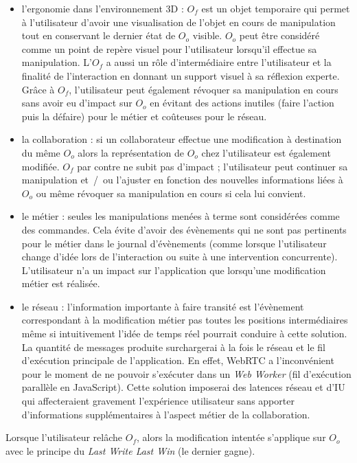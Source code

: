 \begin{itemize}
	\item l'ergonomie dans l'environnement 3D :
	$O_f$ est un objet temporaire qui permet à l'utilisateur
	d'avoir une visualisation de l'objet en cours de manipulation tout en 
	conservant le dernier état de $O_o$ visible. 
	$O_o$ peut être considéré comme un point de repère visuel pour l'utilisateur 
	lorsqu'il effectue sa manipulation. 
	L'$O_f$ a aussi un rôle d'intermédiaire entre l'utilisateur et la 
	finalité de l'interaction en donnant un support visuel à sa réflexion experte.
	Grâce à $O_f$, l'utilisateur peut également révoquer sa manipulation en 
	cours sans avoir eu d'impact sur $O_o$ en évitant des actions inutiles (faire l'action 
	puis la défaire) pour le métier et coûteuses pour le réseau.
	
	\item la collaboration : si un collaborateur effectue une modification 
	à destination du même $O_o$ alors la représentation de $O_o$ chez 
	l'utilisateur est également modifiée. $O_f$ par contre ne subit pas d'impact ; 
	l'utilisateur peut continuer sa manipulation et~/~ou l'ajuster en fonction des 
	nouvelles informations liées à $O_o$ ou même révoquer sa manipulation 
	en cours si cela lui convient.

	\item le métier : seules les manipulations menées à terme sont 
	considérées comme des commandes. Cela évite d'avoir des évènements qui ne 
	sont pas pertinents pour le métier dans le journal d'évènements (comme lorsque 
	l'utilisateur change d'idée lors de l'interaction ou
	suite à une intervention concurrente). L'utilisateur n'a un impact sur l'application 
	que lorsqu'une modification métier est réalisée.
	
	\item le réseau : l'information importante à faire transité est l'évènement 
	correspondant à la modification métier pas toutes les positions intermédiaires 
	même si intuitivement l'idée de temps réel pourrait conduire à cette solution. La 
	quantité de messages produite surchargerai à la fois le réseau et le fil 
	d'exécution principale de l'application. En effet, WebRTC a l'inconvénient pour le 
	moment de ne pouvoir s'exécuter dans un \textit{Web Worker} (fil d'exécution 
	parallèle en JavaScript). Cette solution imposerai des 
	latences réseau et d'\gls{IU} qui affecteraient gravement l'expérience utilisateur
	sans apporter d'informations supplémentaires à l'aspect métier de la 
	collaboration. 
\end{itemize}

Lorsque l'utilisateur relâche $O_f$, alors la modification intentée s'applique sur 
$O_o$ avec le principe du \textit{Last Write Last Win} (le dernier gagne).